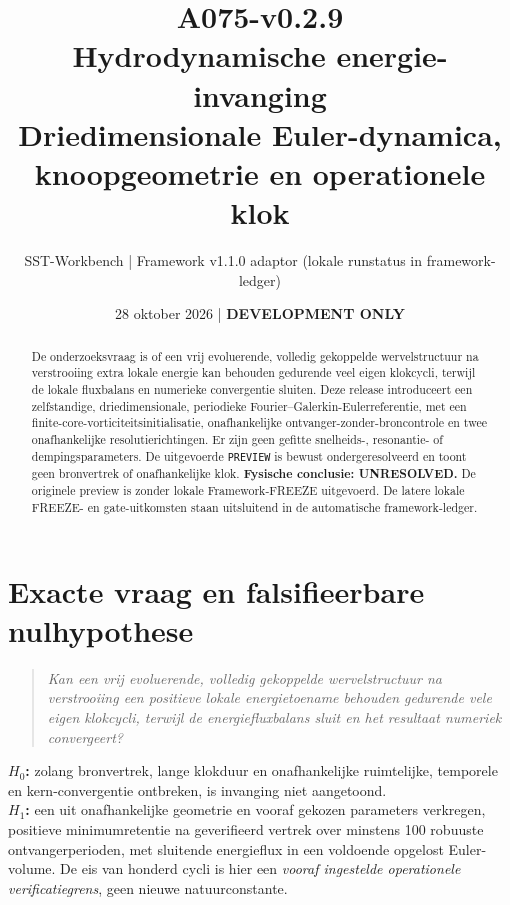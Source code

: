 \documentclass[10pt,a4paper]{article}
\title{\textcolor{main}{A075-v0.2.9}\\Hydrodynamische energie-invanging\\\large Driedimensionale Euler-dynamica, knoopgeometrie en operationele klok}
\author{SST-Workbench | Framework v1.1.0 adaptor (lokale runstatus in framework-ledger)}
\date{28 oktober 2026 | \textbf{DEVELOPMENT ONLY}}
\begin{document}
\maketitle
\begin{abstract}
De onderzoeksvraag is of een vrij evoluerende, volledig gekoppelde wervelstructuur na verstrooiing extra lokale energie kan behouden gedurende veel eigen klokcycli, terwijl de lokale fluxbalans en numerieke convergentie sluiten. Deze release introduceert een zelfstandige, driedimensionale, periodieke Fourier--Galerkin-Eulerreferentie, met een finite-core-vorticiteitsinitialisatie, onafhankelijke ontvanger-zonder-broncontrole en twee onafhankelijke resolutierichtingen. Er zijn geen gefitte snelheids-, resonantie- of dempingsparameters. De uitgevoerde \texttt{PREVIEW} is bewust ondergeresolveerd en toont geen bronvertrek of onafhankelijke klok. \textbf{Fysische conclusie: UNRESOLVED.} De originele preview is zonder lokale Framework-FREEZE uitgevoerd. De latere lokale FREEZE- en gate-uitkomsten staan uitsluitend in de automatische framework-ledger.
\end{abstract}
\section{Exacte vraag en falsifieerbare nulhypothese}
\begin{quote}\emph{Kan een vrij evoluerende, volledig gekoppelde wervelstructuur na verstrooiing een positieve lokale energietoename behouden gedurende vele eigen klokcycli, terwijl de energiefluxbalans sluit en het resultaat numeriek convergeert?}\end{quote}
\textbf{$H_0$:} zolang bronvertrek, lange klokduur en onafhankelijke ruimtelijke, temporele en kern-convergentie ontbreken, is invanging niet aangetoond.\\
\textbf{$H_1$:} een uit onafhankelijke geometrie en vooraf gekozen parameters verkregen, positieve minimumretentie na geverifieerd vertrek over minstens 100 robuuste ontvangerperioden, met sluitende energieflux in een voldoende opgelost Euler-volume.
De eis van honderd cycli is hier een \emph{vooraf ingestelde operationele verificatiegrens}, geen nieuwe natuurconstante.
\end{document}
